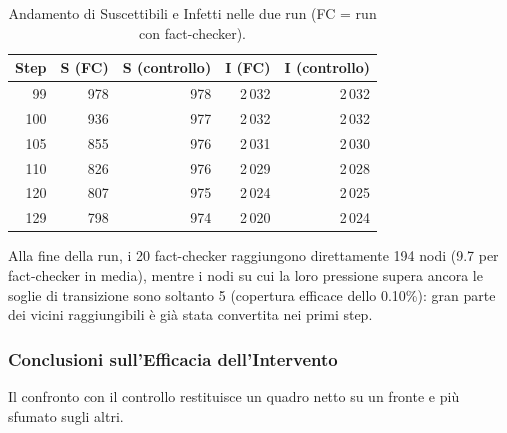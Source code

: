 \documentclass[11pt, a4paper]{article}
\begin{document}
\begin{table}[h]
    \centering
    \small
    \begin{tabular}{rrrrr}
        \toprule
        \textbf{Step} & \textbf{S (FC)} & \textbf{S (controllo)} & \textbf{I (FC)} & \textbf{I (controllo)} \\
        \midrule
        99  & 978 & 978 & 2\,032 & 2\,032 \\
        100 & 936 & 977 & 2\,032 & 2\,032 \\
        105 & 855 & 976 & 2\,031 & 2\,030 \\
        110 & 826 & 976 & 2\,029 & 2\,028 \\
        120 & 807 & 975 & 2\,024 & 2\,025 \\
        129 & 798 & 974 & 2\,020 & 2\,024 \\
        \bottomrule
    \end{tabular}
    \caption{Andamento di Suscettibili e Infetti nelle due run (FC = run con fact-checker).}
    \label{tab:fase3-andamento}
\end{table}

Alla fine della run, i 20 fact-checker raggiungono direttamente 194 nodi (9.7 per fact-checker in media), mentre i nodi su cui la loro pressione supera ancora le soglie di transizione sono soltanto 5 (copertura efficace dello 0.10\%): gran parte dei vicini raggiungibili è già stata convertita nei primi step.

\subsubsection{Conclusioni sull'Efficacia dell'Intervento}
Il confronto con il controllo restituisce un quadro netto su un fronte e più sfumato sugli altri.
\end{document}
